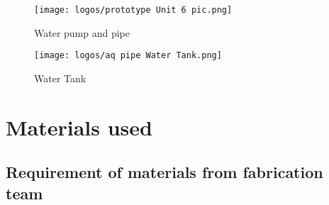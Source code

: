 \documentclass[table,french,english]{rapportCS}
\begin{document}
\begin{figure}[h]
    \centering
    \texttt{[image: logos/prototype Unit 6 pic.png]}
    \caption{Water pump and pipe }
    \label{fig:enter-label}
\end{figure}

\begin{figure}[h]
    \centering
    \texttt{[image: logos/aq pipe Water Tank.png]}
    \caption{Water Tank }
    \label{fig:enter-label}
\end{figure}

\newpage
\vspace{0.8cm}
\section{Materials used}
\subsection{Requirement of materials from fabrication team}
\end{document}
